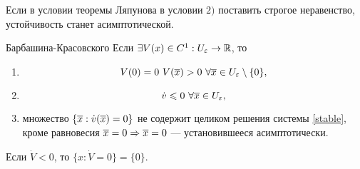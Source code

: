 \begin{ntc}
Если в условии теоремы Ляпунова в условии $2)$ поставить строгое неравенство, устойчивость станет асимптотической.
\end{ntc}

\begin{teo}{Барбашина-Красовского}
Если $\exists V(x) \in C^1 : U_\varepsilon \rightarrow \mathbb{R}$, то
\begin{enumerate}
\item 
\[
	V(0) = 0 \ V({\overline{x}}) > 0 \ \forall {\overline{x}} \in U_\varepsilon \setminus \{ 0 \},
\]
\item
\[
	\dot v \leqslant 0 \  \forall {\overline{x}} \in U_\varepsilon,
\]
\item множество $\{{\overline{x}} : \dot v ({\overline{x}}) = 0\}$ не содержит целиком решения системы \eqref{stable}, кроме равновесия ${\overline{x}} = 0 \Rightarrow {\overline{x}} = 0$ --- установившееся асимптотически.
\end{enumerate}
\end{teo}

\begin{ntc}
Если $\dot V < 0$, то $\{ x: \dot V = 0 \} = \{ 0 \}$.
\end{ntc}

